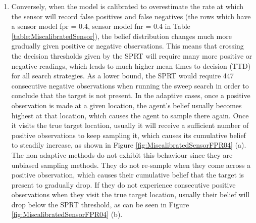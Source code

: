 \begin{enumerate}
    \item Conversely, when the model is calibrated to overestimate the rate at which the sensor will record false positives and false negatives (the rows which have a sensor model fpr = 0.4, sensor model fnr = 0.4 in Table \ref{table:MiscalibratedSensor}), the belief distribution changes much more gradually given positive or negative observations. This means that crossing the decision thresholds given by the SPRT will require many more positive or negative readings, which leads to much higher mean times to decision (TTD) for all search strategies. As a lower bound, the SPRT would require 447 consecutive negative observations when running the sweep search in order to conclude that the target is not present. In the adaptive cases, once a positive observation is made at a given location, the agent's belief usually becomes highest at that location, which causes the agent to sample there again. Once it visits the true target location, usually it will receive a sufficient number of positive observations to keep sampling it, which causes its cumulative belief to steadily increase, as shown in Figure \ref{fig:MiscalibratedSensorFPR04} (a). The non-adaptive methods do not exhibit this behaviour since they are unbiased sampling methods. They do not re-sample when they come across a positive observation, which causes their cumulative belief that the target is present to gradually drop. If they do not experience consecutive positive observations when they visit the true target location, usually their belief will drop below the SPRT threshold, as can be seen in Figure \ref{fig:MiscalibratedSensorFPR04} (b).
\end{enumerate}